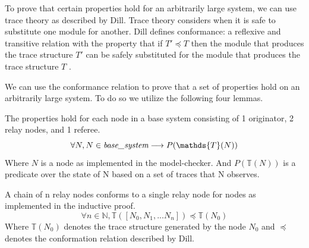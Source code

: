 \documentclass[runningheads]{llncs}
\newcommand{\basesystem}{\emph{base\_system}}
\newcommand{\tracestruc}[1]{\mathds{T}(#1)}
\newif\ifcomments
\newcommand{\egm}[1]{\ifcomments\textcolor{orange}{egm: #1}\fi}
\newcommand{\krs}[1]{\ifcomments\textcolor{blue}{krs: #1}\fi}
\begin{document}
\egm{The subsequent sections, one for each lemma/theorem to support the top level proof need new opening paragraphs. These new openings reframe the text in the context of the stated lemma used in the top-level proof. For example, the model checking section is now defined around the base system and cites proof by exhaustive search as the proof mechanism of the theorem/lemma. That leads to a brief explanation of SPIN/LTL, and then you can transition to the existing text. The same would happen for the other sections. Doest that make sense?}
\krs{I think it makes sense, I've got this all done. I'm thinking it may make sense to restate each lemma in their relevant section and prove they are true in a proof environment. I would use some informal methods like "By exhaustive search." But before I put the lipstick on I'd like to be sure its not a pig. Is it a pig? Does the logic check out for those sections? Does the Theorem 1 logic check out?}

To prove that certain properties hold for an arbitrarily large system, we can use trace theory as described by Dill. Trace theory considers when it is safe to substitute one module for another. Dill defines conformance: a reflexive and transitive relation with the property that if $T' \preceq T$ then the module that produces the trace structure $T'$ can be safely substituted for the module that produces the trace structure $T$ \cite{dill_trace_theory}.

We can use the conformance relation to prove that a set of properties hold on an arbitrarily large system. To do so we utilize the following four lemmas. 

\begin{lemma}
\label{lemma:base_system}
The properties hold for each node in a base system consisting of 1 originator, 2 relay nodes, and 1 referee.
$$\forall N, N \in \basesystem \longrightarrow P(\tracestruc{N})$$
Where $N$ is a node as implemented in the model-checker. And $P(\tracestruc{N})$ is a predicate over the state of N based on a set of traces that N observes.
\end{lemma}
\begin{lemma}
\label{lemma:chain_conform}
A chain of n relay nodes conforms to a single relay node for nodes as implemented in the inductive proof.
$$\forall n \in \mathds{N}, \tracestruc{[N_0, N_1, ... N_n]} \preceq \tracestruc{N_0}
$$
Where $\tracestruc{N_0}$ denotes the trace structure generated by the node $N_0$ and $\preceq$ denotes the conformation relation described by Dill.
\end{lemma}
\end{document}
